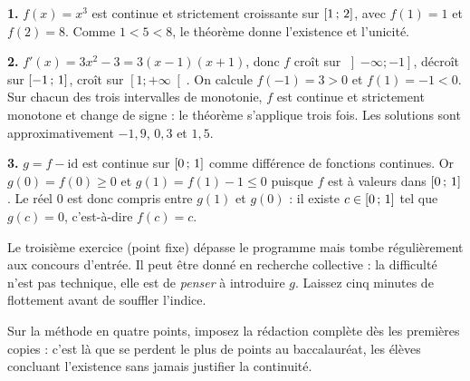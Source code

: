 \begin{corrige}
\textbf{1.} $f(x) = x^{3}$ est continue et strictement croissante sur
$\left[1\,;\,2\right]$, avec $f(1) = 1$ et $f(2) = 8$. Comme $1 < 5 < 8$, le
théorème donne l'existence et l'unicité.

\textbf{2.} $f'(x) = 3x^{2} - 3 = 3(x-1)(x+1)$, donc $f$ croît sur
$\left]-\infty ; -1\right]$, décroît sur $\left[-1\,;\,1\right]$, croît sur
$\left[1 ; +\infty\right[$. On calcule $f(-1) = 3 > 0$ et $f(1) = -1 < 0$.
Sur chacun des trois intervalles de monotonie, $f$ est continue et strictement
monotone et change de signe : le théorème s'applique trois fois. Les solutions
sont approximativement $-1{,}9$, $0{,}3$ et $1{,}5$.

\textbf{3.} $g = f - \mathrm{id}$ est continue sur $\left[0\,;\,1\right]$ comme
différence de fonctions continues. Or $g(0) = f(0) \geq 0$ et
$g(1) = f(1) - 1 \leq 0$ puisque $f$ est à valeurs dans $\left[0\,;\,1\right]$.
Le réel $0$ est donc compris entre $g(1)$ et $g(0)$ : il existe
$c \in \left[0\,;\,1\right]$ tel que $g(c) = 0$, c'est-à-dire $f(c) = c$.
\end{corrige}

\begin{notepourlaclasse}
Le troisième exercice (point fixe) dépasse le programme mais tombe
régulièrement aux concours d'entrée. Il peut être donné en recherche
collective : la difficulté n'est pas technique, elle est de \emph{penser} à
introduire $g$. Laissez cinq minutes de flottement avant de souffler l'indice.

Sur la méthode en quatre points, imposez la rédaction complète dès les
premières copies : c'est là que se perdent le plus de points au baccalauréat,
les élèves concluant l'existence sans jamais justifier la continuité.
\end{notepourlaclasse}


